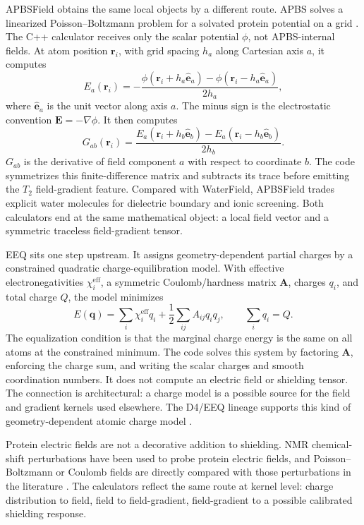 \documentclass[11pt]{article}
\begin{document}
APBSField obtains the same local objects by a different route. APBS solves a
linearized Poisson--Boltzmann problem for a solvated protein potential on a
grid \cite{baker2001}. The C++ calculator receives only the scalar potential
\(\phi\), not APBS-internal fields. At atom position \(\bm r_i\), with grid
spacing \(h_a\) along Cartesian axis \(a\), it computes
\[
  E_a(\bm r_i)
  =
  -\frac{
    \phi(\bm r_i+h_a\hat{\bm e}_a)
    -
    \phi(\bm r_i-h_a\hat{\bm e}_a)}
  {2h_a},
\]
where \(\hat{\bm e}_a\) is the unit vector along axis \(a\). The minus sign is
the electrostatic convention \(\bm E=-\nabla\phi\). It then computes
\[
  G_{ab}(\bm r_i)
  =
  \frac{
    E_a(\bm r_i+h_b\hat{\bm e}_b)
    -
    E_a(\bm r_i-h_b\hat{\bm e}_b)}
  {2h_b}.
\]
\(G_{ab}\) is the derivative of field component \(a\) with respect to coordinate
\(b\). The code symmetrizes this finite-difference matrix and subtracts its
trace before emitting the \(T_2\) field-gradient feature. Compared with
WaterField, APBSField trades explicit water molecules for dielectric boundary
and ionic screening. Both calculators end at the same mathematical object: a
local field vector and a symmetric traceless field-gradient tensor.

EEQ sits one step upstream. It assigns geometry-dependent partial charges by a
constrained quadratic charge-equilibration model. With effective
electronegativities \(\chi_i^{\mathrm{eff}}\), a symmetric Coulomb/hardness
matrix \(\bm A\), charges \(q_i\), and total charge \(Q\), the model minimizes
\[
  E(\bm q)
  =
  \sum_i \chi_i^{\mathrm{eff}}q_i
  +
  \frac12\sum_{ij} A_{ij}q_iq_j,
  \qquad
  \sum_i q_i=Q .
\]
The equalization condition is that the marginal charge energy is the same on
all atoms at the constrained minimum. The code solves this system by factoring
\(\bm A\), enforcing the charge sum, and writing the scalar charges and smooth
coordination numbers. It does not compute an electric field or shielding tensor.
The connection is architectural: a charge model is a possible source for the
field and gradient kernels used elsewhere. The D4/EEQ lineage supports this
kind of geometry-dependent atomic charge model \cite{caldeweyher2019,nistor2006}.

Protein electric fields are not a decorative addition to shielding. NMR
chemical-shift perturbations have been used to probe protein electric fields,
and Poisson--Boltzmann or Coulomb fields are directly compared with those
perturbations in the literature \cite{hass2008,kukic2013}. The calculators
reflect the same route at kernel level: charge distribution to field, field to
field-gradient, field-gradient to a possible calibrated shielding response.
\end{document}
